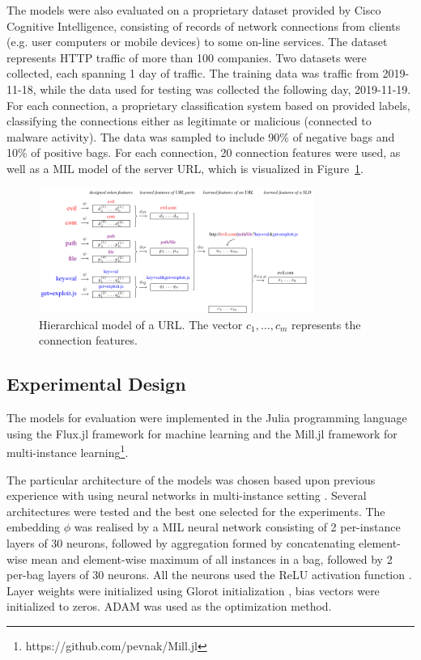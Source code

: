 The models were also evaluated on a proprietary dataset provided by Cisco Cognitive Intelligence, consisting of records of network connections from clients (e.g. user computers or mobile devices) to some on-line services. The dataset represents HTTP traffic of more than 100 companies. Two datasets were collected, each spanning 1 day of traffic. The training data was traffic from 2019-11-18, while the data used for testing was collected the following day, 2019-11-19. For each connection, a proprietary classification system based on \cite{jusko_graph-based_2017} provided labels, classifying the connections either as legitimate or malicious (connected to malware activity). The data was sampled to include 90\% of negative bags and 10\% of positive bags. For each connection, 20 connection features were used, as well as a MIL model of the server URL, which is visualized in Figure~\ref{fig:URL-model}.

\begin{figure}
  \centering
  \includegraphics[width=0.8\textwidth]{images/URL-model/URL-model.pdf}
  \caption{Hierarchical model of a URL. The vector \( c_1, \dots, c_m \) represents the connection features.}\label{fig:URL-model}
\end{figure}

\subsection{Experimental Design}

The models for evaluation were implemented in the Julia programming language \cite{bezanson_julia:_2017} using the Flux.jl framework for machine learning \cite{innes_flux:_2018} and the Mill.jl framework for multi-instance learning\footnote{https://github.com/pevnak/Mill.jl}.

The particular architecture of the models was chosen based upon previous experience with using neural networks in multi-instance setting \cite{pevny_nested_2020}. Several architectures were tested and the best one selected for the experiments. The embedding \( \phi \) was realised by a MIL neural network consisting of 2 per-instance layers of 30 neurons, followed by aggregation formed by concatenating element-wise mean and element-wise maximum of all instances in a bag, followed by 2 per-bag layers of 30 neurons. All the neurons used the ReLU activation function \cite{hahnloser_digital_2000}. Layer weights were initialized using Glorot initialization \cite{glorot_understanding_2010}, bias vectors were initialized to zeros. ADAM \cite{kingma_adam:_2017} was used as the optimization method.

